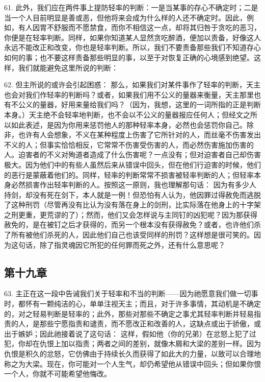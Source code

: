 61. 此外，我们应在两件事上提防轻率的判断：一是当某事的存心不确定时；二是当一个人目前明显是善或恶，但他将来会成为什么样的人还不确定时。因此，例如，有人因胃不舒服而不愿禁食，而你不相信这一点，却将其归咎于贪吃的恶习，你便是在轻率判断。同样，如果你知道某人显然贪吃醉酒，便加以责备，好像这人永远不能改正和改变，你也是轻率判断。所以，我们不要责备那些我们不知道存心如何的事；也不要这样责备那些明显的事，以至于对恢复正确的心境感到绝望。这样，我们就能避免这里所说的判断：\par

62. 但主所说的或许会引起困惑： 那么，如果我们对某件事作了轻率的判断，天主也会对我们作轻率的判断吗？或者，如果我们用不公义的量器来衡量，天主那里也有不公义的量器，好用来量给我们吗？（因为，我想，这里的一词所指的正是判断本身。）天主绝不会轻率地判断，也不会以不公义的量器报应任何人；但经文之所以如此表述，是因为你用来惩罚他人的那种轻率本身，必然也会惩罚你自己。除非，也许有人会想象，不义在某种程度上伤害了它所针对的人，而丝毫不伤害发出不义的人；但事实恰恰相反，它常常不伤害受伤害的人，而必然伤害施加伤害的人。迫害者的不义对殉道者造成了什么伤害呢？一点没有；但对迫害者自己却伤害极大。因为他们中的有些人虽然后来从错误中回头，但在他们行迫害的时候，他们的恶行是蒙蔽着他们的。同样，轻率的判断常常不损害被轻率判断的人；但轻率本身必然损害作出轻率判断的人。按照这一原则，我也理解那句话： 因为有多少人持剑，却没有死在剑下，本人就是一例！但恐怕有人认为，他因罪过得赦免而逃脱了这种刑罚（尽管再没有比认为没有落在身上的剑刑，比实际落在他身上的十字架之刑更重，更荒谬的了）；然而，他们又会怎样说与主同钉的凶犯呢？因为那获得赦免的，是在被钉之后才获得的，而另一个根本没有获得赦免？或者，也许他们杀了所有被他们杀死的人，因此他们自己也该受同样的刑罚？这样想是很可笑的。因为这句话，除了指灵魂因它所犯的任何罪而死之外，还有什么意思呢？\par


\subsection{第十九章}

63. 主正在这一段中告诫我们关于轻率和不当的判断——因为祂愿意我们做一切事时，都怀有一颗纯洁的心，单单注视天主；而且，对于许多事情，其动机是不确定的，对之轻易判断是轻率的；此外，那些对那些不确定之事尤其轻率判断并轻易指责的人，是那些宁愿指责和谴责，而不愿改正和改善的人，这缺点或出于骄傲，或出于嫉妒；因此祂接着说了这句话： 这样，假如他（你的兄弟）在忿怒上犯了过犯，你却在仇恨上加以指责；两者之间的差别，就像木屑和大梁的差别一样。因为仇恨是积久的忿怒，它仿佛由于持续长久而获得了如此大的力量，以致可以合理地称之为大梁。现在，你可能对一个人生气，却仍希望他从错误中回头；但如果你恨一个人，你就不可能希望他悔改。\par

